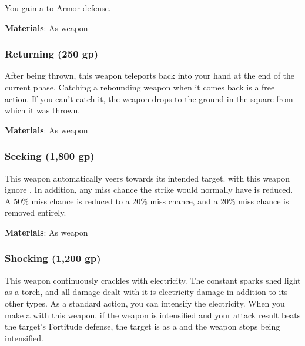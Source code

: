 You gain a   to Armor defense.



\vspace{0.25em}
\textbf{Materials}: As weapon


\lowercase{\hypertarget{item:Returning}{}}\label{item:Returning}
\hypertarget{item:Returning}{\subsubsection{Returning\hfill{} (250 gp)}}

After being thrown, this weapon teleports back into your hand at the end of the current phase.
Catching a rebounding weapon when it comes back is a free action.
If you can't catch it, the weapon drops to the ground in the square from which it was thrown.



\vspace{0.25em}
\textbf{Materials}: As weapon


\lowercase{\hypertarget{item:Seeking}{}}\label{item:Seeking}
\hypertarget{item:Seeking}{\subsubsection{Seeking\hfill{} (1,800 gp)}}

This weapon automatically veers towards its intended target.
 with this weapon ignore .
In addition, any miss chance the strike would normally have is reduced.
A 50\% miss chance is reduced to a 20\% miss chance, and a 20\% miss chance is removed entirely.



\vspace{0.25em}
\textbf{Materials}: As weapon


\lowercase{\hypertarget{item:Shocking}{}}\label{item:Shocking}
\hypertarget{item:Shocking}{\subsubsection{Shocking\hfill{} (1,200 gp)}}

This weapon continuously crackles with electricity.
The constant sparks shed light as a torch, and all damage dealt with it is electricity damage in addition to its other types.
As a standard action, you can intensify the electricity.
When you make a  with this weapon, if the weapon is intensified and your attack result beats the target's Fortitude defense,
the target is \dazed as a  and the weapon stops being intensified.




